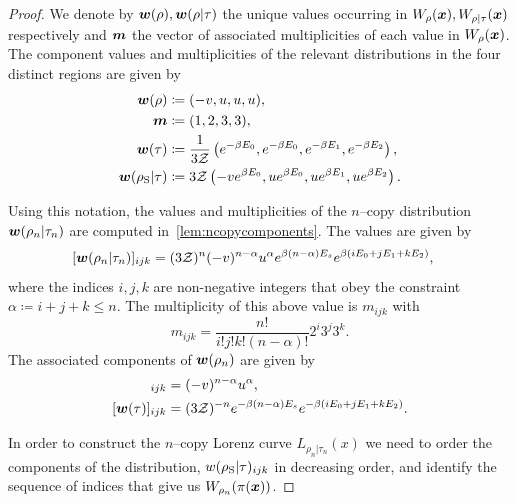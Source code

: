 \documentclass[pra,
aps,
twocolumn,
superscriptaddress,
groupedaddress,
nofootinbib,
reprint
]{revtex4-1}
\begin{document}
\begin{proof}
We denote by $\boldsymbol{w}(\rho), \boldsymbol{w}(\rho|\tau)$ the unique values occurring in $W_\rho(\boldsymbol{x}), W_{\rho|\tau}(\boldsymbol{x})$ respectively and $\bm{m}$ the vector of associated multiplicities of each value in $W_\rho(\boldsymbol{x})$. The component values and multiplicities of the relevant distributions in the four distinct regions are given by
\begin{align}
	\boldsymbol{w}(\rho) &\coloneqq (-v, u, u, u), \\
		\bm{m} &\coloneqq (1,2,3,3), \\
	\boldsymbol{w}(\tau) &\coloneqq \frac{1}{3\mathcal{Z}} \left( e^{-\beta E_0}, e^{-\beta E_0}, e^{-\beta E_1}, e^{-\beta E_2} \right), \\
	\boldsymbol{w}(\rho_{\rm{S}} | \tau) &\coloneqq 3\mathcal{Z} \left( -v e^{\beta E_0}, u e^{\beta E_0}, u e^{\beta E_1}, u e^{\beta E_2} \right). \label{eq:bmw_rescaled}
\end{align}

Using this notation, the values and multiplicities of the $n$--copy distribution $\bm{w}(\rho_n |\tau_n)$ are computed in~\cref{lem:ncopycomponents}. The values are given by 
\begin{align}\label{eq:ncopy_w_rescaled}
	[\boldsymbol{w}(\rho_n | \tau_n)]_{ijk} &= (3\mathcal{Z})^{n} (-v)^{n-\alpha} u^{\alpha} e^{\beta (n-\alpha)E_s} e^{\beta ( i E_0 + j E_1 + k E_2 )},
\end{align}
where the indices $i,j,k$ are non-negative integers that obey the constraint $\alpha \coloneqq i+j+k \leq n$.
The multiplicity of this above value is $m_{ijk}$ with
\begin{equation}
	m_{ijk} = \frac{n!}{i!j!k!(n-\alpha)!} 2^i 3^j 3^k.
\end{equation}
The associated components of $\boldsymbol{w}(\rho_n)$ are given by
\begin{align}
	[\w(\rho_n)]_{ijk} &= (-v)^{n-\alpha} u^{\alpha}, \label{eq:ncopy_wrho}\\
	[\w(\tau)]_{ijk} &= (3\Z)^{-n} e^{-\beta (n-\alpha)E_s} e^{-\beta ( i E_0 + j E_1 + k E_2 )}. \label{eq:ncopy_wsigma}
\end{align}

In order to construct the $n$--copy Lorenz curve $L_{\rho_n|\tau_n}(x)$ we need to order the components of the distribution, $w(\rho_{\rm{S}} | \tau)_{ijk}$ in decreasing order, and identify the sequence of indices that give us $W_{\rho_n}(\pi(\boldsymbol{x}))$.


\end{proof}
\end{document}
